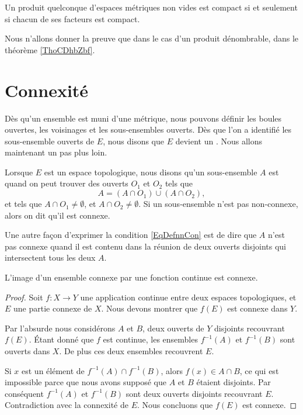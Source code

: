 \begin{theorem}[Tykhonov]\label{ThoFWXsQOZ}
    Un produit quelconque d'espaces métriques non vides est compact si et seulement si chacun de ses facteurs est compact.
\end{theorem}
Nous n'allons donner la preuve que dans le cas d'un produit dénombrable, dans le théorème \ref{ThoCDhbZbf}.

\section{Connexité}

Dès qu'un ensemble est muni d'une métrique, nous pouvons définir les boules ouvertes, les voisinages et les sous-ensembles ouverts. Dès que l'on a identifié les sous-ensemble ouverts de $E$, nous disons que $E$ devient un . Nous allons maintenant un pas plus loin.

\begin{definition}
 Lorsque $E$ est un espace topologique, nous disons qu'un sous-ensemble $A$ est  quand on peut trouver des ouverts $O_1$ et $O_2$ tels que
\begin{equation}    \label{EqDefnnCon}
  A=(A\cap O_1)\cup (A\cap O_2),
\end{equation}
et tels que $A\cap O_1\neq\emptyset$, et $A\cap O_2\neq\emptyset$.
Si un sous-ensemble n'est pas non-connexe, alors on dit qu'il est connexe.
\end{definition}
Une autre façon d'exprimer la condition \eqref{EqDefnnCon} est de dire que $A$ n'est pas connexe quand il est contenu dans la réunion de deux ouverts disjoints qui intersectent tous les deux $A$.

\begin{proposition}\label{PropGWMVzqb}
    L'image d'un ensemble connexe par une fonction continue est connexe.
\end{proposition}

\begin{proof}
    Soit \( f\colon X\to Y\) une application continue entre deux espaces topologiques, et \( E\) une partie connexe de \( X\). Nous devons montrer que \( f(E)\) est connexe dans \( Y\).

    Par l'absurde nous considérons \( A\) et \( B\), deux ouverts de \( Y\) disjoints recouvrant \( f(E)\). Étant donné que \( f\) est continue, les ensembles \( f^{-1}(A)\) et \( f^{-1}(B)\) sont ouverts dans \( X\). De plus ces deux ensembles recouvrent \( E\).

    Si \( x\) est un élément de \( f^{-1}(A)\cap f^{-1}(B)\), alors \( f(x)\in A\cap B\), ce qui est impossible parce que nous avons supposé que \( A\) et \( B\) étaient disjoints. Par conséquent \( f^{-1}(A)\) et \( f^{-1}(B)\) sont deux ouverts disjoints recouvrant \( E\). Contradiction avec la connexité de \( E\). Nous concluons que \( f(E)\) est connexe.
\end{proof}

